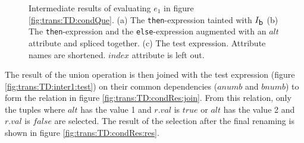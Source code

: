 \begin{myExample}
\begin{figure}[h]
\centering
{}
\phantom{A}
\phantom{A}
\caption[Intermediate results of evaluating $e_1$ in figure \ref{fig:trans:TD:condQue}.]{Intermediate results of
evaluating $e_1$ in figure \ref{fig:trans:TD:condQue}. (a) The
\texttt{then}-expression tainted with $I_{\mbox{\texttt{b}}}$ (b) The \texttt{then}-expression and the \texttt{else}-expression augmented with an $alt$ attribute and spliced together. (c) The test expression.
Attribute names are shortened. $index$ attribute is left out. \label{fig:trans:TD:inter1}}
\end{figure}

The result of the \textsf{union} operation is then joined with the test expression (figure
\ref{fig:trans:TD:inter1:test}) on their common dependencies ($anumb$ and $bnumb$) to form the relation in figure
\ref{fig:trans:TD:condRes:join}. From this relation, only the tuples where $alt$ has the value 1 and $r.val$ is
$true$ or $alt$ has the value 2 and $r.val$ is $false$ are selected. The result of the selection after the final
renaming is shown in figure \ref{fig:trans:TD:condRes:res}.


\end{myExample}
